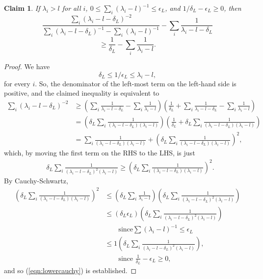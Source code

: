 \documentclass[12pt]{article}
\newtheorem{claim}[theorem]{Claim}
\newcommand{\deltaL}{\delta_{L}}
\newcommand{\epsL}{\epsilon_{L}}
\begin{document}
\begin{claim}\label{clm:lowercauchy}
If $\lambda_{i} > l$ for all $i$,
   $0 \leq \sum_i (\lambda_{i} - l)^{-1} \leq \epsL$,
  and $1/\deltaL - \epsL  \geq 0$,
then
\[\frac{\sum_i (\lambda_i-l-\deltaL)^{-2}}
  {\sum_i (\lambda_i-l-\deltaL)^{-1}-\sum_i (\lambda_i-l)^{-1} }
  -\sum_i \frac{1}{\lambda_i-l-\deltaL} \]
\begin{equation}\label{eqn:lowercauchy}
  \ge
 \frac{1}{\deltaL}-\sum_i\frac{1}{\lambda_i-l}.
\end{equation}
\end{claim}
\begin{proof}
We have 
\[
\deltaL \leq 1/\epsL \leq \lambda_{i} - l,
\]
for every $i$.
So, the denominator of the left-most term on the left-hand side is positive,
 and the claimed inequality is equivalent to
\begin{align*}
\sum_i (\lambda_i-l-\deltaL)^{-2}
&\ge 
\left( {\sum_i \frac{1}{\lambda_i-l-\deltaL}-\sum_i\frac{1}{\lambda_i-l}}\right)
\left(  
 \frac{1}{\deltaL}+\sum_i
 \frac{1}{\lambda_i-l-\deltaL}-\sum_i\frac{1}{\lambda_i-l}\right)
\\&=
\left(\deltaL\sum_i\frac{1}{(\lambda_i-l-\deltaL)(\lambda_i-l)}\right)
\left(  
 \frac{1}{\deltaL}+\deltaL\sum_i\frac{1}{(\lambda_i-l-\deltaL)(\lambda_i-l)}
\right)
\\&=
\sum_i\frac{1}{(\lambda_i-l-\deltaL)(\lambda_i-l)}
+ \left(  
\deltaL\sum_i\frac{1}{(\lambda_i-l-\deltaL)(\lambda_i-l)} \right)^2,
  \end{align*}
which, by moving the first term on the RHS to the LHS, is just
\begin{align*} 
&\deltaL\sum_i \frac{1}{(\lambda_i-l-\deltaL)^2(\lambda_i-l)}
\ge
\left(  \deltaL\sum_i\frac{1}{(\lambda_i-l-\deltaL)(\lambda_i-l)}
\right)^2.\end{align*}
By Cauchy-Schwartz,
\begin{align*}
\left(  \deltaL\sum_i\frac{1}{(\lambda_i-l-\deltaL)(\lambda_i-l)} \right)^2
&\le 
  \left( \deltaL\sum_i\frac{1}{\lambda_i-l}\right)\left(\deltaL\sum_i\frac{1}{(\lambda_i-l-\deltaL)^2(\lambda_i-l)}\right)
\\
&\le
\left( \deltaL\epsL \right)\left(\deltaL\sum_i\frac{1}{(\lambda_i-l-\deltaL)^2(\lambda_i-l)}\right)
\\&\qquad 
 \text{since
$\sum (\lambda_{i} - l)^{-1} \leq \epsL$}\\
&\le
1\left(\deltaL\sum_i\frac{1}{(\lambda_i-l-\deltaL)^2(\lambda_i-l)}\right),
\\&\qquad  \text{since }\frac{1}{\deltaL}-\epsL\ge 0,
\end{align*}
and so (\ref{eqn:lowercauchy}) is established.
\end{proof}
\end{document}
